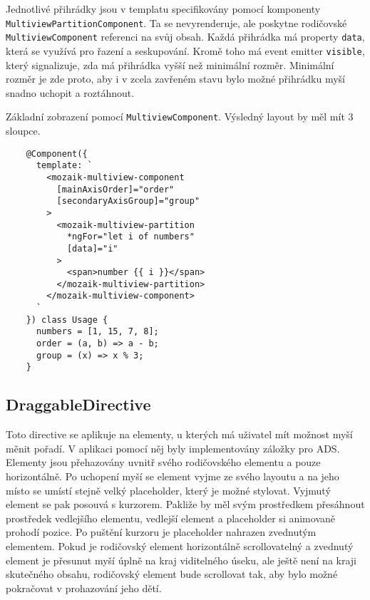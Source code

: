 Jednotlivé přihrádky jsou v templatu specifikovány pomocí komponenty \lstinline|MultiviewPartitionComponent|. Ta se nevyrenderuje, ale poskytne rodičovské \lstinline|MultiviewComponent| referenci na svůj obsah. Každá přihrádka má property \lstinline|data|, která se využívá pro řazení a seskupování. Kromě toho má event emitter \lstinline|visible|, který signalizuje, zda má přihrádka vyšší než minimální rozměr. Minimální rozměr je zde proto, aby i v zcela zavřeném stavu bylo možné přihrádku myší snadno uchopit a roztáhnout.

\begin{exmp}
  Základní zobrazení pomocí \lstinline|MultiviewComponent|. Výsledný layout by měl mít 3 sloupce.

  \begin{lstlisting}
    @Component({
      template: `
        <mozaik-multiview-component
          [mainAxisOrder]="order"
          [secondaryAxisGroup]="group"
        >
          <mozaik-multiview-partition
            *ngFor="let i of numbers"
            [data]="i"
          >
            <span>number {{ i }}</span>
          </mozaik-multiview-partition>
        </mozaik-multiview-component>
      `
    }) class Usage {
      numbers = [1, 15, 7, 8];
      order = (a, b) => a - b;
      group = (x) => x % 3;
    }
  \end{lstlisting}
\end{exmp}

\subsection{DraggableDirective}

Toto directive se aplikuje na elementy, u kterých má uživatel mít možnost myší měnit pořadí. V aplikaci pomocí něj byly implementovány záložky pro ADS. Elementy jsou přehazovány uvnitř svého rodičovského elementu a pouze horizontálně. Po uchopení myší se element vyjme ze svého layoutu a na jeho místo se umístí stejně velký placeholder, který je možné stylovat. Vyjmutý element se pak posouvá s kurzorem. Pakliže by měl svým prostředkem přesáhnout prostředek vedlejšího elementu, vedlejší element a placeholder si animovaně prohodí pozice. Po puštění kurzoru je placeholder nahrazen zvednutým elementem. Pokud je rodičovský element horizontálně scrollovatelný a zvednutý element je přesunut myší úplně na kraj viditelného úseku, ale ještě není na kraji skutečného obsahu, rodičovský element bude scrollovat tak, aby bylo možné pokračovat v prohazování jeho dětí.

